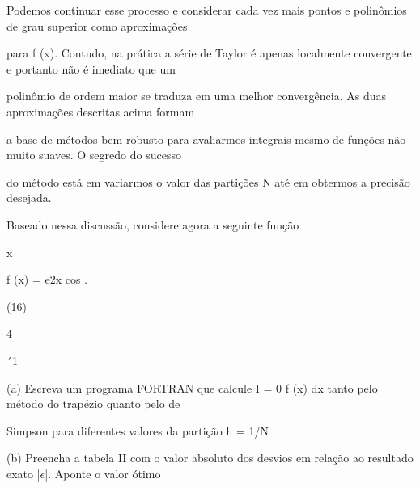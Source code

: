 \documentclass[a4paper,portrait,12pt]{article}
\begin{document}
\begin{flushleft}
Podemos continuar esse processo e considerar cada vez mais pontos e polin\^{o}mios de grau superior como aproxima\c{c}\~{o}es
\end{flushleft}


\begin{flushleft}
para f (x). Contudo, na pr\'{a}tica a s\'{e}rie de Taylor \'{e} apenas localmente convergente e portanto n\~{a}o \'{e} imediato que um
\end{flushleft}


\begin{flushleft}
polin\^{o}mio de ordem maior se traduza em uma melhor converg\^{e}ncia. As duas aproxima\c{c}\~{o}es descritas acima formam
\end{flushleft}


\begin{flushleft}
a base de m\'{e}todos bem robusto para avaliarmos integrais mesmo de fun\c{c}\~{o}es n\~{a}o muito suaves. O segredo do sucesso
\end{flushleft}


\begin{flushleft}
do m\'{e}todo est\'{a} em variarmos o valor das parti\c{c}\~{o}es N at\'{e} em obtermos a precis\~{a}o desejada.
\end{flushleft}


\begin{flushleft}
Baseado nessa discuss\~{a}o, considere agora a seguinte fun\c{c}\~{a}o
\end{flushleft}


\begin{flushleft}
x
\end{flushleft}


\begin{flushleft}
f (x) = e2x cos .
\end{flushleft}


(16)


4


´1


\begin{flushleft}
(a) Escreva um programa FORTRAN que calcule I = 0 f (x) dx tanto pelo m\'{e}todo do trap\'{e}zio quanto pelo de
\end{flushleft}


\begin{flushleft}
Simpson para diferentes valores da parti\c{c}\~{a}o h = 1/N .
\end{flushleft}


\begin{flushleft}
(b) Preencha a tabela II com o valor absoluto dos desvios em rela\c{c}\~{a}o ao resultado exato |$\epsilon$|. Aponte o valor \'{o}timo
\end{flushleft}
\end{document}
